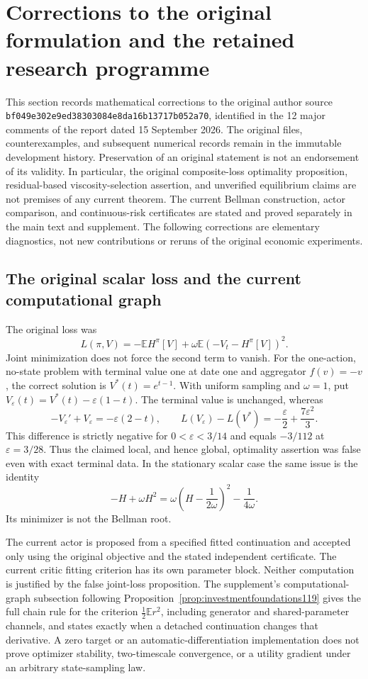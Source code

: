 \section{Corrections to the original formulation and the retained research programme}
\label{dev:originalcorrection119}

This section records mathematical corrections to the original author source
\texttt{bf049e302e9ed38303084e8da16b13717b052a70}, identified in the
12 major comments of the report dated 15 September 2026.  The original files,
counterexamples, and subsequent numerical records remain in the immutable
development history.  Preservation of an original statement is not an
endorsement of its validity.  In particular, the original composite-loss
optimality proposition, residual-based viscosity-selection assertion, and
unverified equilibrium claims are not premises of any current theorem.
The current Bellman construction, actor comparison, and continuous-risk
certificates are stated and proved separately in the main text and supplement.
The following corrections are elementary diagnostics, not new contributions
or reruns of the original economic experiments.

\subsection{The original scalar loss and the current computational graph}
\label{dev:compositeloss119}

The original loss was
\[
 L(\pi,V)=-\mathbb E H^\pi[V]
       +\omega\mathbb E(-V_t-H^\pi[V])^2.
\]
Joint minimization does not force the second term to vanish.  For the
one-action, no-state problem with terminal value one at date one and
aggregator $f(v)=-v$, the correct solution is $V^*(t)=e^{t-1}$.
With uniform sampling and $\omega=1$, put
$V_\varepsilon(t)=V^*(t)-\varepsilon(1-t)$.
The terminal value is unchanged, whereas
\[
 -V_\varepsilon'+V_\varepsilon=-\varepsilon(2-t),\qquad
 L(V_\varepsilon)-L(V^*)
       =-\frac{\varepsilon}{2}+\frac{7\varepsilon^2}{3}.
\]
This difference is strictly negative for $0<\varepsilon<3/14$ and equals
$-3/112$ at $\varepsilon=3/28$.  Thus the claimed local, and hence global,
optimality assertion was false even with exact terminal data.  In the
stationary scalar case the same issue is the identity
\[
 -H+\omega H^2
   =\omega\left(H-\frac{1}{2\omega}\right)^2
      -\frac{1}{4\omega}.
\]
Its minimizer is not the Bellman root.

The current actor is proposed from a specified fitted continuation and
accepted only using the original objective and the stated independent
certificate.  The current critic fitting criterion has its own parameter
block.  Neither computation is justified by the false joint-loss proposition.
The supplement's computational-graph subsection following
Proposition~\ref{prop:investmentfoundations119} gives the full chain rule for
the criterion $\tfrac12\mathbb E r^2$, including generator and shared-parameter
channels, and states exactly when a detached continuation changes that
derivative.  A zero target or an automatic-differentiation implementation does
not prove optimizer stability, two-timescale convergence, or a utility
gradient under an arbitrary state-sampling law.

